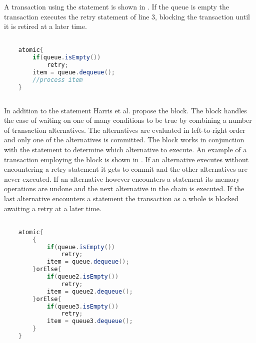 A transaction using the  statement is shown in . If the queue is empty the transaction executes the retry statement of line 3, blocking the transaction until it is retired at a later time.
\begin{lstlisting}[label=lst:stm_retry,
  caption={The retry statement},
  language=Java,  
  showspaces=false,
  showtabs=false,
  breaklines=true,
  showstringspaces=false,
  breakatwhitespace=true,
  commentstyle=\color{greencomments},
  keywordstyle=\color{bluekeywords},
  stringstyle=\color{redstrings},
  morekeywords={atomic, retry}]  % Start your code-block

	atomic{
		if(queue.isEmpty())
			retry;
		item = queue.dequeue();
		//process item
	}
       
\end{lstlisting}

In addition to the  statement Harris et al. propose the  block. The  block handles the case of waiting on one of many conditions to be true by combining a number of transaction alternatives. The alternatives are evaluated in left-to-right order and only one of the alternatives is committed\cite[p. 52]{harris2005composable}. The  block works in conjunction with the  statement to determine which alternative to execute. An example of a transaction employing the  block is shown in . If an alternative executes without encountering a retry statement it gets to commit and the other alternatives are never executed\cite[p. 74]{harris2010transactional}. If an alternative however encounters a  statement its memory operations are undone and the next alternative in the chain is executed\cite[p. 74]{harris2010transactional}. If the last alternative encounters a  statement the transaction as a whole is blocked awaiting a retry at a later time\cite[p. 74]{harris2010transactional}.

\begin{lstlisting}[label=lst:stm_orelse,
  caption={The orElse block},
  language=Java,  
  showspaces=false,
  showtabs=false,
  breaklines=true,
  showstringspaces=false,
  breakatwhitespace=true,
  commentstyle=\color{greencomments},
  keywordstyle=\color{bluekeywords},
  stringstyle=\color{redstrings},
  morekeywords={atomic, retry, orElse}]  % Start your code-block

	atomic{
		{
			if(queue.isEmpty())
				retry;
			item = queue.dequeue();
		}orElse{
			if(queue2.isEmpty())
				retry;
			item = queue2.dequeue();
		}orElse{
			if(queue3.isEmpty())
				retry;
			item = queue3.dequeue();
		}
	}
       
\end{lstlisting}

